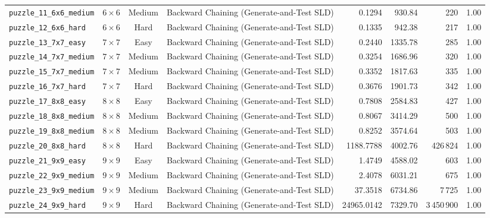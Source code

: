 \documentclass{article}
\begin{document}
\begin{longtable}{@{}lccl r r r c@{}}
  \texttt{puzzle\_11\_6x6\_medium} & $6\times6$ & Medium & Backward Chaining (Generate-and-Test SLD) & 0.1294 & 930.84 & 220 & 1.00 \\
  \texttt{puzzle\_12\_6x6\_hard} & $6\times6$ & Hard & Backward Chaining (Generate-and-Test SLD) & 0.1335 & 942.38 & 217 & 1.00 \\
  \texttt{puzzle\_13\_7x7\_easy} & $7\times7$ & Easy & Backward Chaining (Generate-and-Test SLD) & 0.2440 & 1335.78 & 285 & 1.00 \\
  \texttt{puzzle\_14\_7x7\_medium} & $7\times7$ & Medium & Backward Chaining (Generate-and-Test SLD) & 0.3254 & 1686.96 & 320 & 1.00 \\
  \texttt{puzzle\_15\_7x7\_medium} & $7\times7$ & Medium & Backward Chaining (Generate-and-Test SLD) & 0.3352 & 1817.63 & 335 & 1.00 \\
  \texttt{puzzle\_16\_7x7\_hard} & $7\times7$ & Hard & Backward Chaining (Generate-and-Test SLD) & 0.3676 & 1901.73 & 342 & 1.00 \\
  \texttt{puzzle\_17\_8x8\_easy} & $8\times8$ & Easy & Backward Chaining (Generate-and-Test SLD) & 0.7808 & 2584.83 & 427 & 1.00 \\
  \texttt{puzzle\_18\_8x8\_medium} & $8\times8$ & Medium & Backward Chaining (Generate-and-Test SLD) & 0.8067 & 3414.29 & 500 & 1.00 \\
  \texttt{puzzle\_19\_8x8\_medium} & $8\times8$ & Medium & Backward Chaining (Generate-and-Test SLD) & 0.8252 & 3574.64 & 503 & 1.00 \\
  \texttt{puzzle\_20\_8x8\_hard} & $8\times8$ & Hard & Backward Chaining (Generate-and-Test SLD) & 1188.7788 & 4002.76 & 426\,824 & 1.00 \\
  \texttt{puzzle\_21\_9x9\_easy} & $9\times9$ & Easy & Backward Chaining (Generate-and-Test SLD) & 1.4749 & 4588.02 & 603 & 1.00 \\
  \texttt{puzzle\_22\_9x9\_medium} & $9\times9$ & Medium & Backward Chaining (Generate-and-Test SLD) & 2.4078 & 6031.21 & 675 & 1.00 \\
  \texttt{puzzle\_23\_9x9\_medium} & $9\times9$ & Medium & Backward Chaining (Generate-and-Test SLD) & 37.3518 & 6734.86 & 7\,725 & 1.00 \\
  \texttt{puzzle\_24\_9x9\_hard} & $9\times9$ & Hard & Backward Chaining (Generate-and-Test SLD) & 24965.0142 & 7329.70 & 3\,450\,900 & 1.00 \\
\end{longtable}
\end{document}
